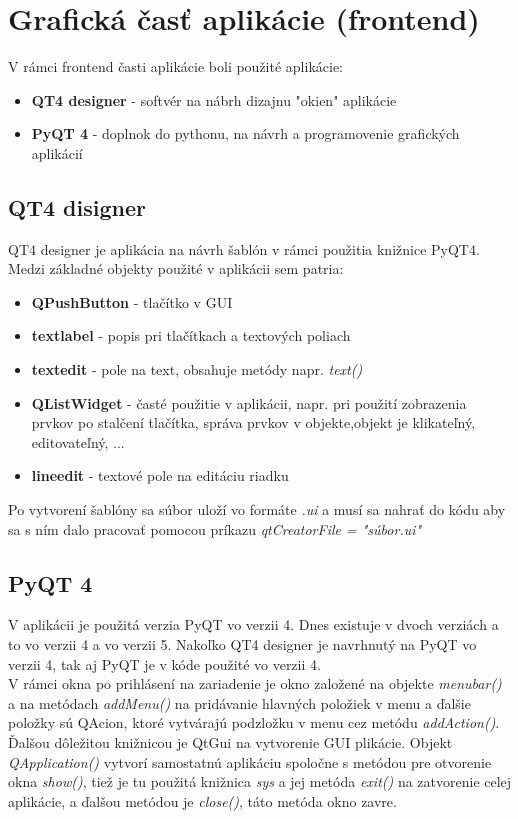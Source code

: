 \chapter{Grafická časť aplikácie (frontend)}
V rámci frontend časti aplikácie boli použité aplikácie:\begin{itemize}
\item \textbf{QT4 designer} - softvér na nábrh dizajnu "okien" aplikácie
\item \textbf{PyQT 4} - doplnok do pythonu, na návrh a programovenie grafických aplikácií
\end{itemize} 
\section{QT4 disigner}
QT4 designer je aplikácia na návrh šablón v rámci použitia knižnice PyQT4. Medzi základné objekty použité v aplikácii sem patria:
\begin{itemize}
\item \textbf{QPushButton} - tlačítko v GUI
\item \textbf{textlabel} - popis pri tlačítkach a textových poliach
\item \textbf{textedit} - pole na text, obsahuje metódy napr. \textit{text()}
\item \textbf{QListWidget} - časté použitie v aplikácii, napr. pri použití zobrazenia prvkov po stalčení tlačítka, správa prvkov v objekte,objekt je klikateľný, editovateľný, ...
\item \textbf{lineedit} - textové pole na editáciu riadku
\end{itemize} 
Po vytvorení šablóny sa súbor uloží vo formáte \textit{.ui} a musí sa nahrať do kódu aby sa s ním dalo pracovať pomocou príkazu \textit{qtCreatorFile = "súbor.ui"}
\section{PyQT 4}
V aplikácii je použitá verzia PyQT vo verzii 4. Dnes existuje v dvoch verziách a to vo verzii 4 a vo verzii 5. Nakoľko QT4 designer je navrhnutý na PyQT vo verzii 4, tak aj PyQT je v kóde použité vo verzii 4. \\
V rámci okna po prihlásení na zariadenie je okno založené na objekte \textit{menubar()} a na metódach \textit{addMenu()} na pridávanie hlavných položiek v menu a ďalšie položky sú QAcion, ktoré vytvárajú podzložku v menu cez metódu \textit{addAction()}. Ďalšou dôležitou knižnicou je QtGui na vytvorenie GUI plikácie. Objekt \textit{QApplication()} vytvorí samostatnú aplikáciu spoločne s metódou pre otvorenie okna \textit{show()}, tiež je tu použitá knižnica \textit{sys} a jej metóda \textit{exit()} na zatvorenie celej aplikácie,  a ďalšou metódou je \textit{close()}, táto metóda okno zavre.
